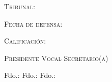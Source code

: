 \begin{titlepage}
    \makeatletter
	{\flushright \LARGE \textsc{Tribunal:}}
	
	\hspace*{1cm}{\Large Presidente: \hrulefill}
	
	\hspace*{1cm}{\Large Vocal: \hrulefill}
	
	\hspace*{1cm}{\Large Secretario(a): \hrulefill}
	
	{\flushright \LARGE \textsc{Fecha de defensa:} \hrulefill}
	
	{\flushright \LARGE \textsc{Calificación:} \hrulefill}
	
	{\large \textsc{Presidente}} \hspace{3cm} {\large \textsc{Vocal}} \hspace{3cm} {\large \textsc{Secretario(a)}}\\
    
    \vspace*{2.5cm}
    
    Fdo.: \hspace{5cm} Fdo.: \hspace{3.6cm} Fdo.:		
            
	\cleardoublepage
    \makeatother
\end{titlepage}

